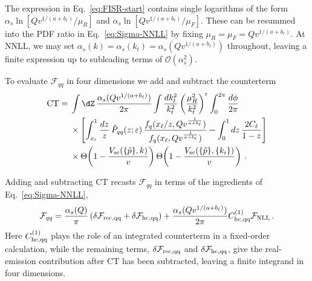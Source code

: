 The expression in Eq.~\eqref{eq:FISR-start} contains single logarithms of
the form $\alpha_s\ln[Qv^{1/(a+b_\ell)}/\mu_R]$ and
$\alpha_s\ln[Qv^{1/(a+b_\ell)}/\mu_F]$. These can be
resummed into the PDF ratio in Eq.~\eqref{eq:Sigma-NNLL}
by fixing $\mu_R=\mu_F=Qv^{1/(a+b_\ell)}$.
At NNLL, we may set $\alpha_s(k)=\alpha_s(k_t)=\alpha_s(Qv^{1/(a+b_\ell)})$ 
throughout, leaving a finite expression up to subleading terms of $\mathcal{O}(\alpha_s^2)$.

To evaluate $\mathcal{F}_{qq}$ in four dimensions we add and subtract
the counterterm
  \begin{align}
\mathrm{CT}={}&\int \dZ\, \frac{\alpha_s(Qv^{1/(a+b_\ell)})}{2\pi} \int\frac{dk_t^2}{k_t^2}\left(\frac{\mu_R^2}{k_t^2}\right)^{\varepsilon} \int_0^{2\pi}\frac{d\phi}{2\pi}\nonumber\\
&\times\left[\int_{x_\ell}^1\frac{dz}{z}\,\hat P_{qq}(z;\varepsilon)\,\frac{f_q(x_\ell/z,Qv^{\frac{1}{a+b_\ell}})}{f_q(x_\ell,Qv^{\frac{1}{a+b_\ell}})}-\int_0^1dz\,\frac{2 C_\ell}{1-z}\right]\nonumber\\
&\times\Theta\!\left(1-\frac{V_{\mathrm{sc}}(\{\tilde{p}\},k)}{v}\right)\Theta\!\left(1-\frac{V_{\mathrm{sc}}(\{\tilde{p}\},\{k_i\})}{v}\right)\,.
\end{align}
  
Adding and subtracting $\mathrm{CT}$ recasts $\mathcal{F}_{qq}$ in
terms of the ingredients of Eq.~\eqref{eq:Sigma-NNLL},
\begin{equation}
  \label{eq:FISR-split}
  \mathcal{F}_{qq} = \frac{\alpha_s(Q)}{\pi}\left( \delta \mathcal{F}_{\rm rec,qq}+\delta\mathcal{F}_{\rm hc,qq}\right)+ \frac{\alpha_s(Q v^{1/(a+b_\ell)})}{2\pi} C^{(1)}_{\rm hc,qq} \mathcal{F}_{\rm NLL}\,.
\end{equation}
Here $C^{(1)}_{\rm hc,qq}$ plays the role of an integrated counterterm
in a fixed-order calculation, while the remaining terms,
$\delta\mathcal{F}_{\rm rec,qq}$ and $\delta\mathcal{F}_{\rm hc,qq}$, give the real-emission
contribution after $\mathrm{CT}$ has been
subtracted, leaving a finite integrand in four dimensions.


